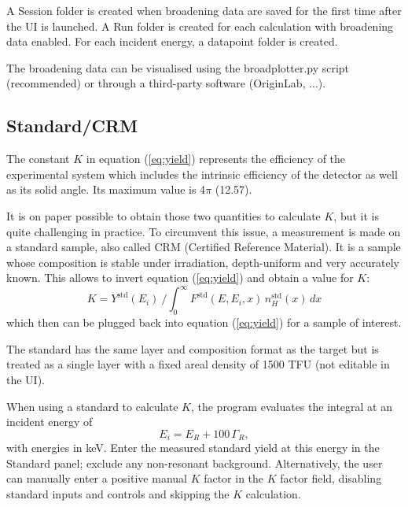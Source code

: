 \documentclass[11pt,a4paper]{article}
\begin{document}
A Session folder is created when broadening data are saved for the first time after the UI is launched. A Run folder is created for each calculation with broadening data enabled. For each incident energy, a datapoint folder is created.

The broadening data can be visualised using the broadplotter.py script (recommended) or through a third-party software (OriginLab, ...).

\subsection{Standard/CRM}
\label{sec:efficiency}
The constant $K$ in equation (\ref{eq:yield}) represents the efficiency of the experimental system which includes the intrinsic efficiency of the detector as well as its solid angle. Its maximum value is 4$\pi$ (12.57).

It is on paper possible to obtain those two quantities to calculate $K$, but it is quite challenging in practice. To circumvent this issue, a measurement is made on a standard sample, also called CRM (Certified Reference Material). It is a sample whose composition is stable under irradiation, depth-uniform and very accurately known. This allows to invert equation (\ref{eq:yield}) and obtain a value for $K$:
\begin{equation}
    K = Y^\text{std}(E_i)\ / \int_{0}^{\infty} F^\text{std}(E,E_i,x) \, n_H^\text{std}(x)\, dx
\end{equation}
which then can be plugged back into equation (\ref{eq:yield}) for a sample of interest.

The standard has the same layer and composition format as the target but is treated as a single layer with a fixed areal density of 1500 TFU (not editable in the UI).

When using a standard to calculate $K$, the program evaluates the integral at an incident energy of
\[
    E_i = E_R + 100\,\Gamma_R,
\]
with energies in keV. Enter the measured standard yield at this energy in the Standard panel; exclude any non-resonant background. Alternatively, the user can manually enter a positive manual $K$ factor in the $K$ factor field, disabling standard inputs and controls and skipping the $K$ calculation.
\end{document}
